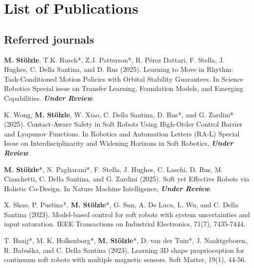 \chapter*{List of Publications}
\label{publications}

\section*{Referred journals}

\begin{enumerate}{
    \item[\faFileTextO \, \stepcounter{enumi}\arabic{enumi}.] \textbf{M. Stölzle}, T.K. Rusch*, Z.J. Patterson*, R. Pérez Dattari, F. Stella, J. Hughes, C. Della Santina, and D. Rus (2025). Learning to Move in Rhythm: Task-Conditioned Motion Policies with Orbital Stability Guarantees. In Science Robotics Special issue on Transfer Learning, Foundation Models, and Emerging Capabilities. 
    \textbf{\emph{Under Review}}.
    \item[\stepcounter{enumi}\arabic{enumi}.] K. Wong, \textbf{M. Stölzle}, W. Xiao, C. Della Santina, D. Rus*, and G. Zardini* (2025). Contact-Aware Safety in Soft Robots Using High-Order Control Barrier and Lyapunov Functions. In Robotics and Automation Letters (RA-L) Special Issue on Interdisciplinarity and Widening Horizons in Soft Robotics, \textbf{\emph{Under Review}}.
    \item[\faFileTextO \, \stepcounter{enumi}\arabic{enumi}.] \textbf{M. Stölzle}*, N. Pagliarani*, F. Stella, J. Hughes, C. Laschi, D. Rus, M. Cianchetti, C. Della Santina, and G. Zardini (2025). Soft yet Effective Robots via Holistic Co-Design. In Nature Machine Intelligence, \textbf{\emph{Under Review}}.
    \item X. Shao, P. Pustina*, \textbf{M. Stölzle}*, G. Sun, A. De Luca, L. Wu, and C. Della Santina (2023). Model-based control for soft robots with system uncertainties and input saturation. IEEE Transactions on Industrial Electronics, 71(7), 7435-7444.
    \item[\faFileTextO \, \stepcounter{enumi}\arabic{enumi}.] T. Baaij*, M. K. Holkenborg*, \textbf{M. Stölzle}*, D. van der Tuin*, J. Naaktgeboren, R. Babuška, and C. Della Santina (2023). Learning 3D shape proprioception for continuum soft robots with multiple magnetic sensors. Soft Matter, 19(1), 44-56.
}
\end{enumerate}
